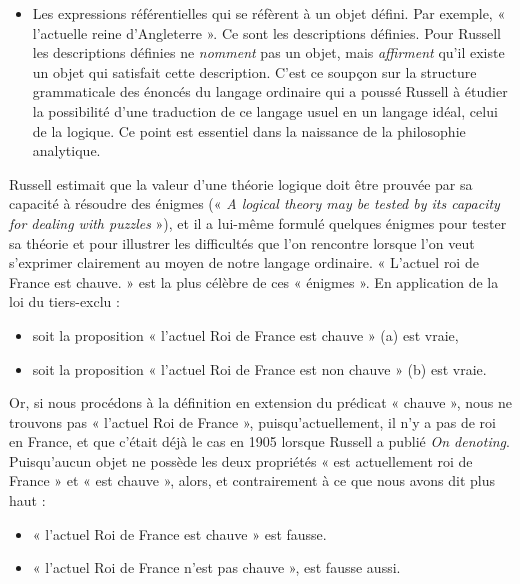 \begin{itemize}
\item Les expressions référentielles qui se réfèrent à un objet défini. Par exemple, « l’actuelle reine d’Angleterre ». Ce sont les descriptions définies. Pour Russell les descriptions définies ne \textit{nomment} pas un objet, mais \textit{affirment} qu’il existe un objet qui satisfait cette description. C’est ce soupçon sur la structure grammaticale des énoncés du langage ordinaire qui a poussé Russell à étudier la possibilité d’une traduction de ce langage usuel en un langage idéal, celui de la logique. Ce point est essentiel dans la naissance de la philosophie analytique.
\end{itemize}

Russell estimait que la valeur d’une théorie logique doit être prouvée par sa capacité à résoudre des énigmes (« \textit{A logical theory may be tested by its capacity for dealing with puzzles} »), et il a lui-même formulé quelques énigmes pour tester sa théorie et pour illustrer les difficultés que l’on rencontre lorsque l’on veut s’exprimer clairement au moyen de notre langage ordinaire. « L’actuel roi de France est chauve. » est la plus célèbre de ces « énigmes ». En application de la loi du tiers-exclu :
\begin{itemize}
\item soit la proposition « l’actuel Roi de France est chauve » (a) est vraie,
\item soit la proposition « l’actuel Roi de France est non chauve » (b) est vraie.
\end{itemize}
Or, si nous procédons à la définition en extension du prédicat « chauve », nous ne trouvons pas « l’actuel Roi de France », puisqu’actuellement, il n’y a pas de roi en France, et que c’était déjà le cas en 1905 lorsque Russell a publié \textit{On denoting}. Puisqu’aucun objet ne possède les deux propriétés « est actuellement roi de France » et « est chauve », alors, et contrairement à ce que nous avons dit plus haut :
\begin{itemize}
\item « l’actuel Roi de France est chauve » est fausse.
\item « l’actuel Roi de France n’est pas chauve », est fausse aussi.
\end{itemize}

